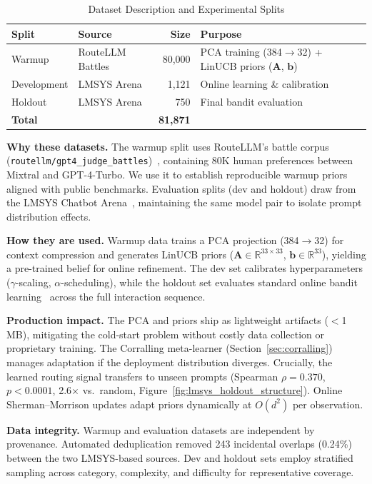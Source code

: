 
\begin{table}[t]
\centering
\caption{Dataset Description and Experimental Splits}
\label{tab:dataset}
\small
\begin{tabular}{@{}llrl@{}}
\toprule
\textbf{Split} & \textbf{Source} & \textbf{Size} & \textbf{Purpose} \\
\midrule
Warmup          & RouteLLM Battles & 80,000 & PCA training (384$\rightarrow$32) + LinUCB priors ($\mathbf{A}$, $\mathbf{b}$) \\
Development     & LMSYS Arena      & 1,121 & Online learning \& calibration \\
Holdout         & LMSYS Arena      & 750 & Final bandit evaluation \\
\midrule
\textbf{Total} & & \textbf{81,871} & \\
\bottomrule
\end{tabular}

\vspace{0.8em}
\footnotesize

\textbf{Why these datasets.}
The warmup split uses RouteLLM's battle corpus (\texttt{routellm/gpt4\_judge\_battles})~\cite{ong2024routellm}, containing 80K human preferences between Mixtral and GPT-4-Turbo. We use it to establish reproducible warmup priors aligned with public benchmarks.
Evaluation splits (dev and holdout) draw from the LMSYS Chatbot Arena~\cite{zheng2023lmsys}, maintaining the same model pair to isolate prompt distribution effects.

\textbf{How they are used.}
Warmup data trains a PCA projection (384$\rightarrow$32) for context compression and generates LinUCB priors ($\mathbf{A} \in \mathbb{R}^{33 \times 33}$, $\mathbf{b} \in \mathbb{R}^{33}$), yielding a pre-trained belief for online refinement.
The dev set calibrates hyperparameters ($\gamma$-scaling, $\alpha$-scheduling), while the holdout set evaluates standard online bandit learning~\cite{lattimore2020bandit} across the full interaction sequence.

\textbf{Production impact.}
The PCA and priors ship as lightweight artifacts ($<$1\,MB), mitigating the cold-start problem without costly data collection or proprietary training.
The Corralling meta-learner (Section~\ref{sec:corralling}) manages adaptation if the deployment distribution diverges.
Crucially, the learned routing signal transfers to unseen prompts (Spearman $\rho = 0.370$, $p < 0.0001$, 2.6$\times$ vs.\ random, Figure~\ref{fig:lmsys_holdout_structure}).
Online Sherman--Morrison updates adapt priors dynamically at $O(d^2)$ per observation.

\textbf{Data integrity.}
Warmup and evaluation datasets are independent by provenance.
Automated deduplication removed 243 incidental overlaps (0.24\%) between the two LMSYS-based sources.
Dev and holdout sets employ stratified sampling across category, complexity, and difficulty for representative coverage.

\end{table}
